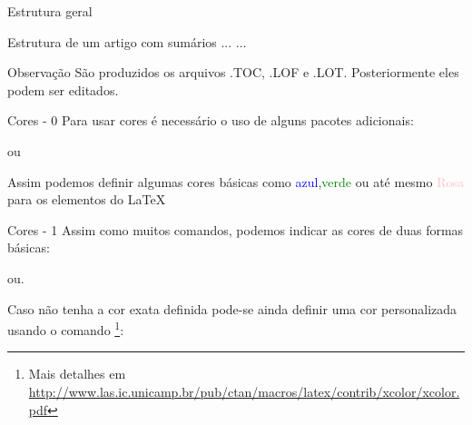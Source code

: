 \begin{frame}{Estrutura geral}
	\begin{Codigo}{Estrutura de um artigo com sumários}
		\n
		...\n
		\n
			\n
			\n
			\n
			\n
			\n
			...\n
	\end{Codigo}


    \pause
	\begin{Observacao}{Observação}
		São produzidos os arquivos .TOC, .LOF e .LOT. Posteriormente eles podem ser editados.
	\end{Observacao}
\end{frame}

\begin{frame}{Cores - 0}
	Para usar cores é necessário o uso de alguns pacotes adicionais:
	\pause
	\begin{Codigo}{}
		\n
		ou\n
	\end{Codigo}
	
	\pause

	Assim podemos definir algumas cores básicas como \textcolor{blue}{azul},\textcolor{green}{verde} ou até  mesmo \textcolor{pink}{Rosa} para os elementos do \LaTeX
\end{frame}

\begin{frame}{Cores - 1}
	Assim como muitos comandos, podemos indicar as cores de duas formas básicas:
	\pause
	\begin{Codigo}{}
		\n ou\n {}.
	\end{Codigo}

    \pause
	Caso não tenha a cor exata definida pode-se ainda definir uma cor personalizada usando o comando \footnote{Mais detalhes em \url{http://www.las.ic.unicamp.br/pub/ctan/macros/latex/contrib/xcolor/xcolor.pdf}}:
	
	\pause
	\begin{Codigo}{}
	\end{Codigo}
\end{frame}

